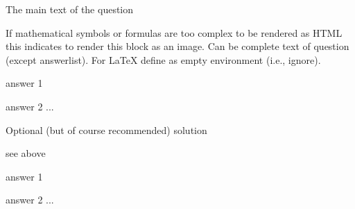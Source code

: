 
\begin{question}           %

  The main text of the question

  \begin{image}            %
    If mathematical symbols or formulas are too complex to be rendered
    as HTML this indicates to render this block as an image. Can be
    complete text of question (except answerlist). For LaTeX define as
    empty environment (i.e., ignore).
  \end{image}

  \begin{answerlist}       %
   \item answer 1
   \item answer 2
    ...
  \end{answerlist}

\end{question}

\begin{solution}           %

  Optional (but of course recommended) solution

  \begin{image}            %
    see above
  \end{image}

  \begin{answerlist}       %
   \item answer 1
   \item answer 2
    ...
  \end{answerlist}
  
\end{solution}




